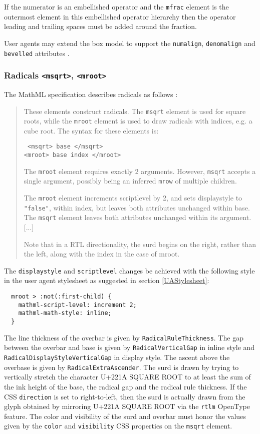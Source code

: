 If the numerator is an embellished operator and the {\tt mfrac} element is the
outermost element in this embellished operator hierarchy then the operator
leading and trailing spaces must be added around the fraction.

User agents may extend the box model to support the {\tt numalign},
{\tt denomalign} and {\tt bevelled} attributes \cite{MathML3}.

\subsubsection{Radicals {\tt <msqrt>}, {\tt <mroot>}}\label{radicals}

The MathML specification describes radicals as follows \cite{MathML3}:
%
\begin{quote}
These elements construct radicals. The {\tt msqrt} element is used for square
roots, while the {\tt mroot} element is used to draw radicals with indices,
e.g. a cube root. The syntax for these elements is:

{\tt
  <msqrt> base </msqrt> \\
  <mroot> base index </mroot>}

The {\tt mroot} element requires exactly 2 arguments. However, {\tt msqrt}
accepts a single argument, possibly being an inferred {\tt mrow} of multiple
children.

The {\tt mroot} element increments scriptlevel by 2, and sets displaystyle to
{\tt "false"},
within index, but leaves both attributes unchanged within base. The
{\tt msqrt} element leaves both attributes unchanged within its argument. [...]

Note that in a RTL directionality, the surd begins on the right, rather than
the left, along with the index in the case of mroot.
\end{quote}

The {\tt displaystyle} and {\tt scriptlevel} changes be achieved with the
following style in the user agent stylesheet as suggested in section
\ref{UAStylesheet}:
%
\begin{lstlisting}
  mroot > :not(:first-child) {
    mathml-script-level: increment 2;
    mathml-math-style: inline;
  }
\end{lstlisting}

The line thickness of the overbar is given by
{\tt RadicalRuleThickness}.
The gap between the overbar and base is given by
{\tt RadicalVerticalGap}
in inline style and {\tt RadicalDisplayStyleVerticalGap}
in display style.
The ascent above the overbase is given by {\tt RadicalExtraAscender}.
The surd is drawn by trying to vertically stretch the character
U+221A SQUARE ROOT
to at least the sum of the ink height of the base, the radical gap and the
radical rule thickness. If the CSS {\tt direction} is set to right-to-left,
then the surd is actually drawn from the glyph obtained by mirroring
U+221A SQUARE ROOT via the {\tt rtlm} OpenType feature.
The color and visibility of the surd and overbar must honor the values given by
the {\tt color} and {\tt visibility} CSS properties on the {\tt msqrt} element.

